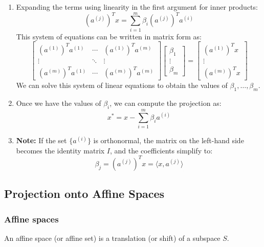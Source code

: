 \begin{derivation}
\begin{enumerate}
            \item Expanding the terms using linearity in the first argument for inner products:
            \[
            (a^{(j)})^T x = \sum_{i=1}^{m} \beta_i (a^{(j)})^T a^{(i)}
            \]
            This system of equations can be written in matrix form as:
            \[
            \begin{bmatrix}
            (a^{(1)})^T a^{(1)} & \cdots & (a^{(1)})^T a^{(m)} \\
            \vdots & \ddots & \vdots \\
            (a^{(m)})^T a^{(1)} & \cdots & (a^{(m)})^T a^{(m)}
            \end{bmatrix}
            \begin{bmatrix}
            \beta_1 \\
            \vdots \\
            \beta_m
            \end{bmatrix}
            =
            \begin{bmatrix}
            (a^{(1)})^T x \\
            \vdots \\
            (a^{(m)})^T x
            \end{bmatrix}
            \]
            We can solve this system of linear equations to obtain the values of $\beta_1, \dots, \beta_m$.
            
            \item Once we have the values of $\beta_i$, we can compute the projection as:
            \[
            x^* = x - \sum_{i=1}^{m} \beta_i a^{(i)}
            \]
            
            \item \textbf{Note:} If the set $\{a^{(i)}\}$ is orthonormal, the matrix on the left-hand side becomes the identity matrix $I$, and the coefficients simplify to:
            \[
            \beta_j = (a^{(j)})^T x = \langle x, a^{(j)} \rangle
            \]
        \end{enumerate}
    \end{derivation}

    \subsection{Projection onto Affine Spaces}
    
        \subsubsection{Affine spaces}
        \begin{definition}
            An affine space (or affine set) is a translation (or shift) of a subspace $S$.
        \end{definition}

